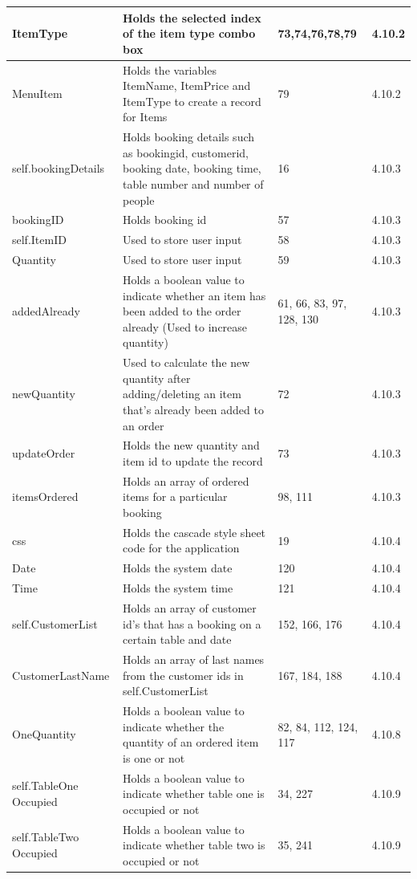 \begin{center}
\begin{longtable}{|p{3cm}|p{4.5cm}|p{3cm}|p{1cm}|}
ItemType & Holds the selected index of the item type combo box & 73,74,76,78,79 &4.10.2 \\ \hline
MenuItem & Holds the variables ItemName, ItemPrice and ItemType to create a record for Items & 79 &4.10.2 \\ \hline
self.bookingDetails & Holds booking details such as bookingid, customerid, booking date, booking time, table number and number of people & 16&4.10.3 \\ \hline
bookingID & Holds booking id & 57 &4.10.3 \\ \hline
self.ItemID & Used to store user input & 58 &4.10.3 \\ \hline
Quantity & Used to store user input & 59 & 4.10.3\\ \hline
addedAlready & Holds a boolean value to indicate whether an item has been added to the order already (Used to increase quantity) & 61, 66, 83, 97, 128, 130 &4.10.3 \\ \hline
newQuantity & Used to calculate the new quantity after adding/deleting an item that's already been added to an order & 72 & 4.10.3\\ \hline
updateOrder & Holds the new quantity and item id to update the record & 73 &4.10.3 \\ \hline
itemsOrdered & Holds an array of ordered items for a particular booking & 98, 111&4.10.3 \\ \hline
css & Holds the cascade style sheet code for the application&19 &4.10.4 \\ \hline
Date & Holds the system date & 120 &4.10.4 \\ \hline
Time & Holds the system time & 121 &4.10.4 \\ \hline
self.CustomerList & Holds an array of customer id's that has a booking on a certain table and date & 152, 166, 176 &4.10.4 \\ \hline
CustomerLastName & Holds an array of last names from the customer ids in self.CustomerList & 167, 184, 188 &4.10.4 \\ \hline
OneQuantity & Holds a boolean value to indicate whether the quantity of an ordered item is one or not &82, 84, 112, 124, 117 & 4.10.8\\ \hline
self.TableOne Occupied & Holds a boolean value to indicate whether table one is occupied or not &34, 227 &4.10.9 \\ \hline
 self.TableTwo Occupied &Holds a boolean value to indicate whether table two is occupied or not &35, 241 & 4.10.9\\ \hline

\end{longtable}
\end{center}
